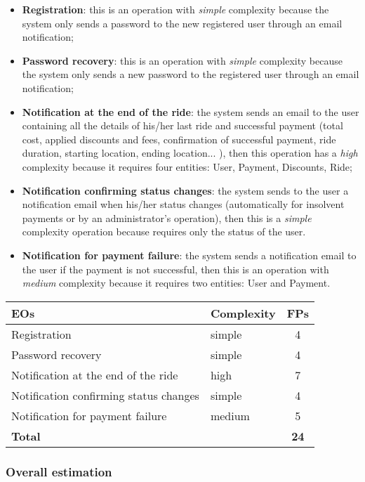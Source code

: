 \begin{itemize}
	\item \textbf{Registration}: this is an operation with \textit{simple} complexity because the system only sends a password to the new registered user through an email notification;
	\item \textbf{Password recovery}: this is an operation with \textit{simple} complexity because the system only sends a new password to the registered user through an email notification;
	\item \textbf{Notification at the end of the ride}: the system sends an email to the user containing all the details of his/her last ride and successful payment (total cost, applied discounts and fees, confirmation of successful payment, ride duration, starting location, ending location... ), then this operation has a \textit{high} complexity because it requires four entities: User, Payment, Discounts, Ride;
	\item \textbf{Notification confirming status changes}: the system sends to the user a notification email when his/her status changes (automatically for insolvent payments or by an administrator's operation), then this is a \textit{simple} complexity operation because requires only the status of the user. 
	\item \textbf{Notification for payment failure}: the system sends a notification email to the user if the payment is not successful, then this is an operation with \textit{medium} complexity because it requires two entities: User and Payment.
\end{itemize}
\begin{center}
	\begin{tabular}{|l|l|c|}
		\hline
		\textbf{EOs} 	& \textbf{Complexity} 	& \textbf{FPs} \\
		\hline
		Registration 	& simple 	& 4 \\
		Password recovery 	& simple 	& 4 \\
		Notification at the end of the ride 	& high 	& 7 \\
		Notification confirming status changes 	& simple 	& 4 \\
		Notification for payment failure 	& medium 	& 5 \\
		\hline \hline
		\textbf{Total} 	& 	& \textbf{24} \\
		\hline
	\end{tabular}
\end{center}

\subsubsection{Overall estimation}

